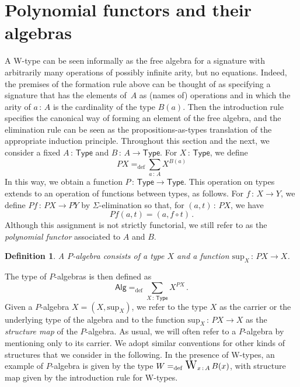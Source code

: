 \documentclass[10pt,a4paper,oneside,reqno]{amsart}
\theoremstyle{mythm}
\theoremstyle{mydef}
\newtheorem{definition}[theorem]{Definition}
\theoremstyle{myrmk}
\newcommand{\defeq}{=_{\mathrm{def}}}
\newcommand{\co}{\,{:}\,}
\DeclareMathOperator*{\WW}{\text{\Large $\mathrm{W}$}}
\newcommand{\U}{\mathsf{Type}}
\newcommand{\Palg}{\mathsf{Alg}}
\renewcommand{\sup}{\mathrm{sup}}
\begin{document}

\newpage

\section{Polynomial functors and their algebras}
\label{section:wfiles}


A W-type can be seen informally as the free algebra for a signature
with arbitrarily many operations of possibly infinite arity, but no equations. Indeed, the premises of the formation rule above can be thought of as specifying a signature that has the elements of~$A$ as (names of) operations and in which the arity of $a \co A$ is the cardinality of the type $B(a)$. Then the introduction rule specifies the canonical way of forming an element of the free algebra, and the elimination rule can be seen as the propositions-as-types translation of the appropriate induction principle. Throughout this section and the next, we consider a fixed  $A \co \U$ and $B \co A \to \U$. For $X \co \U$,
we define
\[
PX \defeq \sum_{a \co A} X^{B(a)}
\]
In this way, we obtain a function $P \co \U \to \U$. This operation on types extends to an operation of functions between 
 types, as follows. For $f \co X\to Y$, we define $P f  \co PX\to PY$ by $\Sigma$-elimination
so that, for $(a, t) \co PX$, we have 
\[
Pf (a, t) = (a,f\circ t) \, .
\] 
Although this assignment is not strictly functorial, we still refer to  as the \emph{polynomial functor} associated to $A$ and $B$. 

\begin{definition} A \emph{$P$-algebra} consists of a type $X$ and a function $\sup_X \co PX \to X$. 
\end{definition}

\smallskip

 The type of $P$-algebras is then defined as 
 \[
 \Palg  \defeq \sum_{X \co \U} X^{PX} \, .
 \]
 Given a $P$-algebra $X = (X, \sup_X)$,
 we refer to the type $X$ as the carrier or the underlying type of the algebra and to the function $\sup_X \co PX\to X$ as the \emph{structure map} of the $P$-algebra. 
 As usual,  we will often refer to a 
 $P$-algebra by mentioning only to its carrier. We adopt similar conventions for other kinds of structures that we consider
 in the following.  In the
 presence of W-types, an example of $P$-algebra is given by the type $W \defeq \WW_{x\co A} B(x)$, with structure map given by the introduction rule for W-types.
 
\end{document}
